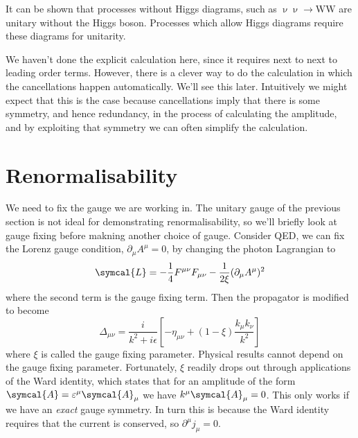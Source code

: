 \documentclass[fleqn]{NotesClass}
\newcommand{\Pparticle}[1]{\mathrm{#1}}
\newcommand{\Pnu}{\ensuremath{\upnu}}
\newcommand{\PW}{\ensuremath{\Pparticle{W}}}
\newcommand{\APnu}{\ensuremath{\upnu}}
\newcommand{\lagrangianDensity}{\symcal{L}}
\newcommand{\amplitude}{\symcal{A}}
\newcommand{\minkowskiMetric}{\eta}
\begin{document}
    It can be shown that processes without Higgs diagrams, such as \(\Pnu\APnu \to \PW\PW\) are unitary without the Higgs boson.
    Processes which allow Higgs diagrams require these diagrams for unitarity.
    
    We haven't done the explicit calculation here, since it requires next to next to leading order terms.
    However, there is a clever way to do the calculation in which the cancellations happen automatically.
    We'll see this later.
    Intuitively we might expect that this is the case because cancellations imply that there is some symmetry, and hence redundancy, in the process of calculating the amplitude, and by exploiting that symmetry we can often simplify the calculation.
    
    \section{Renormalisability}
    We need to fix the gauge we are working in.
    The unitary gauge of the previous section is not ideal for demonstrating renormalisability, so we'll briefly look at gauge fixing before makning another choice of gauge.
    Consider QED, we can fix the Lorenz gauge condition, \(\partial_\mu A^\mu = 0\), by changing the photon Lagrangian to
    \begin{equation}
        \lagrangianDensity = -\frac{1}{4}F^{\mu\nu}F_{\mu\nu} - \frac{1}{2\xi} (\partial_\mu A^\mu)^2
    \end{equation}
    where the second term is the gauge fixing term.
    Then the propagator is modified to become
    \begin{equation}
        \Delta_{\mu\nu} = \frac{i}{k^2 + i\epsilon} \left[ -\minkowskiMetric_{\mu\nu} + (1 - \xi) \frac{k_\mu k_\nu}{k^2} \right]
    \end{equation}
    where \(\xi\) is called the gauge fixing parameter.
    Physical results cannot depend on the gauge fixing parameter.
    Fortunately, \(\xi\) readily drops out through applications of the Ward identity, which states that for an amplitude of the form \(\amplitude = \varepsilon^\mu \amplitude_\mu\) we have \(k^\mu \amplitude_\mu = 0\).
    This only works if we have an \emph{exact} gauge symmetry.
    In turn this is because the Ward identity requires that the current is conserved, so \(\partial^\mu j_\mu = 0\).
    
\end{document}
